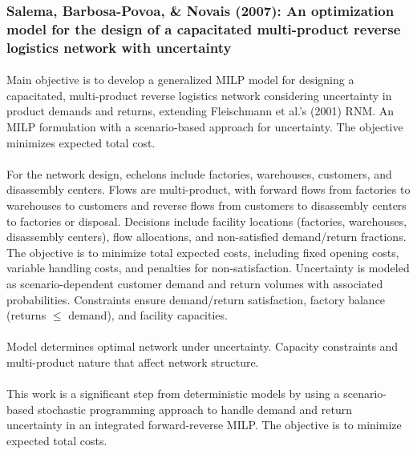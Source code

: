 \subsubsection{Salema, Barbosa-Povoa, \& Novais (2007): An optimization model for the design of a capacitated multi-product reverse logistics network with uncertainty}
\paragraph{} Main objective is to develop a generalized MILP model for designing a capacitated, multi-product reverse logistics network considering uncertainty in product demands and returns, extending Fleischmann et al.'s (2001) RNM. An MILP formulation with a scenario-based approach for uncertainty. The objective minimizes expected total cost.

\paragraph{} For the network design, echelons include factories, warehouses, customers, and disassembly centers. Flows are multi-product, with forward flows from factories to warehouses to customers and reverse flows from customers to disassembly centers to factories or disposal. Decisions include facility locations (factories, warehouses, disassembly centers), flow allocations, and non-satisfied demand/return fractions. The objective is to minimize total expected costs, including fixed opening costs, variable handling costs, and penalties for non-satisfaction. Uncertainty is modeled as scenario-dependent customer demand and return volumes with associated probabilities. Constraints ensure demand/return satisfaction, factory balance (returns $\le$ demand), and facility capacities.

\paragraph{} Model determines optimal network under uncertainty. Capacity constraints and multi-product nature that affect network structure.

\paragraph{} This work is a significant step from deterministic models by using a scenario-based stochastic programming approach to handle demand and return uncertainty in an integrated forward-reverse MILP. The objective is to minimize expected total costs.

